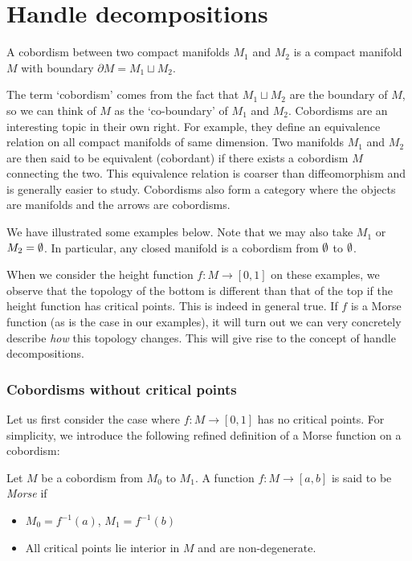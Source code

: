 \section{Handle decompositions}

\begin{definition}
A cobordism between two compact manifolds $M_1$ and $M_2$ is a compact manifold $M$  with boundary $\partial M = M_1 \sqcup M_2$.
\end{definition}


The term `cobordism' comes from the fact that $M_1 \sqcup M_2$ are the boundary of $M$, so we can think of $M$ as the `co-boundary' of $M_1$ and $M_2$.
Cobordisms are an interesting topic in their own right.
For example, they define an equivalence relation on all compact manifolds of same dimension. Two manifolds $ M_1$ and $M_2$ are then said to be equivalent (cobordant) if there exists a cobordism $M$ connecting the two.
This equivalence relation is coarser than diffeomorphism and is generally easier to study.
Cobordisms also form a category where the objects are manifolds and the arrows are cobordisms.

We have illustrated some examples below.
Note that we may also take $M_1$ or $M_2 = \emptyset$.
In particular, any closed manifold is a cobordism from $\emptyset$ to $\emptyset$.
\begin{figure}[H]
    \centering
\end{figure}

When we consider the height function $f: M \to  [0, 1]$ on these examples,
we observe that the topology of the bottom is different than that of the top if the height function has critical points.
This is indeed in general true.
If $f$ is a Morse function (as is the case in our examples), it will turn out we can very concretely describe \emph{how} this topology changes.
This will give rise to the concept of handle decompositions.

\subsubsection*{Cobordisms without critical points}
Let us first consider the case where $f: M \to [0, 1]$ has no critical points. 
For simplicity, we introduce the following refined definition of a Morse function on a cobordism:
\begin{definition}
    Let $M$ be a cobordism from $M_0$ to $M_1$.
    A function $f: M \to  [a, b]$ is said to be \emph{Morse} if 
    \begin{itemize}
        \item $M_0 = f^{-1}(a)$, $M_1 = f^{-1}(b)$
        \item All critical points lie interior in $M$ and are non-degenerate.
    \end{itemize}
\end{definition}

